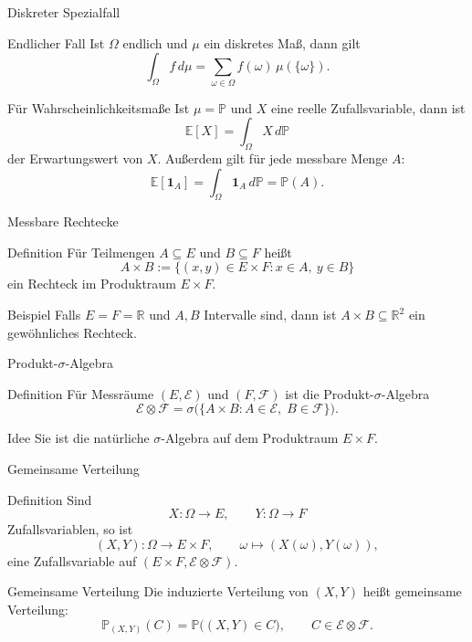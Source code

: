 \documentclass{beamer}
\begin{document}
\begin{frame}{Diskreter Spezialfall}
\begin{block}{Endlicher Fall}
Ist \(\Omega\) endlich und \(\mu\) ein diskretes Maß, dann gilt
\[
\int_\Omega f\,d\mu
=
\sum_{\omega\in\Omega} f(\omega)\,\mu(\{\omega\}).
\]
\end{block}

\begin{block}{Für Wahrscheinlichkeitsmaße}
Ist \(\mu=\mathbb P\) und $X$ eine reelle Zufallsvariable, dann ist
\[
\mathbb E[X]=\int_\Omega X\,d\mathbb P
\]
der Erwartungswert von $X$. Außerdem gilt für jede messbare Menge \(A\):
\[
\mathbb E[\mathbf{1}_A]=\int_\Omega \mathbf{1}_A\,d\mathbb P = \mathbb P(A).
\]
\end{block}
\end{frame}

\begin{frame}{Messbare Rechtecke}
\begin{block}{Definition}
Für Teilmengen \(A\subseteq E\) und \(B\subseteq F\) hei\ss{}t
\[
A\times B:=\{(x,y)\in E\times F : x\in A,\ y\in B\}
\]
ein Rechteck im Produktraum \(E\times F\).
\end{block}

\begin{block}{Beispiel}
Falls \(E=F=\mathbb R\) und \(A,B\) Intervalle sind, dann ist \(A\times B\subseteq\mathbb R^2\)
ein gewöhnliches Rechteck.
\end{block}
\end{frame}

\begin{frame}{Produkt-\(\sigma\)-Algebra}
\begin{block}{Definition}
Für Messräume \((E,\mathcal E)\) und \((F,\mathcal F)\) ist die Produkt-\(\sigma\)-Algebra
\[
\mathcal E\otimes\mathcal F
=
\sigma\bigl(\{A\times B : A\in\mathcal E,\; B\in\mathcal F\}\bigr).
\]
\end{block}

\begin{block}{Idee}
Sie ist die natürliche \(\sigma\)-Algebra auf dem Produktraum \(E\times F\).
\end{block}
\end{frame}

\begin{frame}{Gemeinsame Verteilung}
\begin{block}{Definition}
Sind
\[
X\colon \Omega\to E,
\qquad
Y\colon \Omega\to F
\]
Zufallsvariablen, so ist
\[
(X,Y)\colon \Omega\to E\times F,
\qquad
\omega\mapsto (X(\omega),Y(\omega)),
\]
eine Zufallsvariable auf \((E\times F,\mathcal E\otimes\mathcal F)\).
\end{block}

\begin{block}{Gemeinsame Verteilung}
Die induzierte Verteilung von \((X,Y)\) hei\ss{}t gemeinsame Verteilung:
\[
\mathbb P_{(X,Y)}(C)=\mathbb P\bigl((X,Y)\in C\bigr),
\qquad
C\in\mathcal E\otimes\mathcal F.
\]
\end{block}
\end{frame}
\end{document}
